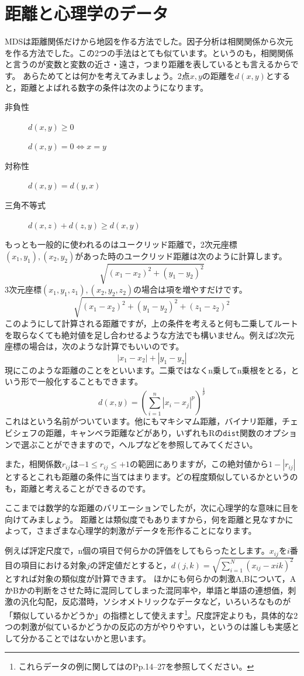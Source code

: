 \documentclass{ltjsbook}
\begin{document}
\section{距離と心理学のデータ}
MDSは距離関係だけから地図を作る方法でした。因子分析は相関関係から次元を作る方法でした。この2つの手法はとても似ています。というのも，相関関係と言うのが変数と変数の近さ・遠さ，つまり距離を表しているとも言えるからです。
あらためてとは何かを考えてみましょう。2点$x,y$の距離を$d(x,y)$とすると，距離とよばれる数字の条件は次のようになります。
\begin{description}
    \item[非負性] $d(x,y)\ge 0$
    \item[] $d(x,y)=0 \Leftrightarrow x=y$
    \item[対称性] $d(x,y)=d(y,x)$
    \item[三角不等式] $d(x,z) + d(z,y) \ge d(x,y)$
\end{description}
もっとも一般的に使われるのはユークリッド距離で，2次元座標$(x_1,y_1),(x_2,y_2)$があった時のユークリッド距離は次のように計算します。
\[ \sqrt{(x_1-x_2)^2+(y_1-y_2)^2} \]
3次元座標$(x_1,y_1,z_1),(x_2,y_2,z_2)$の場合は項を増やすだけです。
\[ \sqrt{(x_1-x_2)^2+(y_1-y_2)^2+(z_1-z_2)^2} \]
このようにして計算される距離ですが，上の条件を考えると何も二乗してルートを取らなくても絶対値を足し合わせるような方法でも構いません。例えば2次元座標の場合は，次のような計算でもいいのです。
\[ |x_1-x_2|+|y_1-y_2| \]
現にこのような距離のことをといいます。二乗ではなくn乗してn乗根をとる，という形で一般化することもできます。
\[ d(x,y) = \left( \sum_{i=1}^n |x_i - x_j|^p\right)^{\frac{1}{p}} \]
これはという名前がついています。他にもマキシマム距離，バイナリ距離，チェビシェフの距離，キャンベラ距離などがあり，いずれもRの\texttt{dist}関数のオプションで選ぶことができますので，ヘルプなどを参照してみてください。

また，相関係数$r_{ij}$は$-1 \le r_{ij} \le +1$の範囲にありますが，この絶対値から$1-|r_{ij}|$とするとこれも距離の条件に当てはまります。どの程度類似しているかというのも，距離と考えることができるのです。

ここまでは数学的な距離のバリエーションでしたが，次に心理学的な意味に目を向けてみましょう。
距離とは類似度でもありますから，何を距離と見なすかによって，さまざまな心理学的刺激がデータを形作ることになります。

例えば評定尺度で，n個の項目で何らかの評価をしてもらったとします。$x_{ij}$を$i$番目の項目における対象$j$の評定値だとすると，$d(j,k) = \sqrt{\sum_{i=1}^N (x_{ij}-x{ik})^2 }$とすれば対象の類似度が計算できます。
ほかにも何らかの刺激A,Bについて，AかBかの判断をさせた時に混同してしまった混同率や，単語と単語の連想価，刺激の汎化勾配，反応潜時，ソシオメトリックなデータなど，いろいろなものが「類似しているかどうか」の指標として使えます\footnote{これらデータの例に関しては\citet{高根芳雄1980-02}のPp.14--27を参照してください。}。尺度評定よりも，具体的な2つの刺激が似ているかどうかの反応の方がやりやすい，というのは誰しも実感として分かることではないかと思います。
\end{document}
